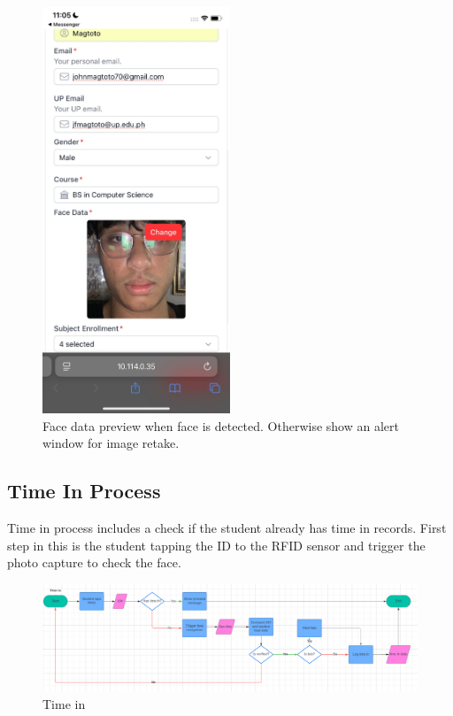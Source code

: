 \begin{figure}[h] %
	\centering
	\includegraphics[width=0.5\textwidth]{figures/chapter4/student_form_mobile_preview.jpg} %
	\caption{Face data preview when face is detected. Otherwise show an alert window for image retake.}
	\label{fig:student_form_mobile_preview}
\end{figure}
\clearpage
\subsection{Time In Process}
Time in process includes a check if the student already has time in records. First step in this is the student tapping the ID to the RFID sensor and trigger the photo capture to check the face.
\begin{figure}[h] %
	\centering
	\includegraphics[width=1.0\textwidth]{figures/chapter4/timein.png} %
	\caption{Time in}
	\label{fig:timein}
\end{figure}


